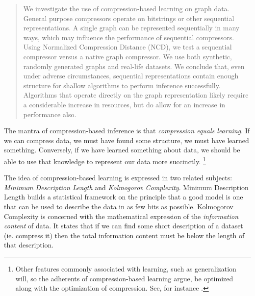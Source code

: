\documentclass{article}
\begin{document}

\begin{abstract}
We investigate the use of compression-based learning on graph data. General purpose compressors operate on bitstrings or other sequential representations. A single graph can be represented sequentially in many ways, which may influence the performance of sequential compressors. Using Normalized Compression Distance (NCD), we test a sequential compressor versus a native graph compressor. We use both synthetic, randomly generated graphs and real-life datasets.  We conclude that, even under adverse circumstances, sequential representations contain enough structure for shallow algorithms to perform inference successfully. Algorithms that operate directly on the graph representation likely require a considerable increase in resources, but do allow for an increase in performance also.
\end{abstract}

The mantra of compression-based inference is that \emph{compression equals learning}. If we can compress data, we must have found some structure, we must have learned something. Conversely, if we have learned something about data, we should be able to use that knowledge to represent our data more succinctly. \footnote{Other features commonly associated with learning, such as generalization will, so the adherents of compression-based learning argue, be optimized along with the optimization of compression. See, for instance .}

The idea of compression-based learning is expressed in two related subjects: \emph{Minimum Description Length} and \emph{Kolmogorov Complexity}. Minimum Description Length \cite{grunwald2007minimum} builds a statistical framework on the principle that a good model is one that can be used to describe the data in as few bits as possible. Kolmogorov Complexity \cite{li1997introduction} is concerned with the mathematical expression of the \emph{information content} of  data. It states that if we can find some short description of a dataset (ie. compress it) then the total information content must be below the length of that description.
\end{document}
